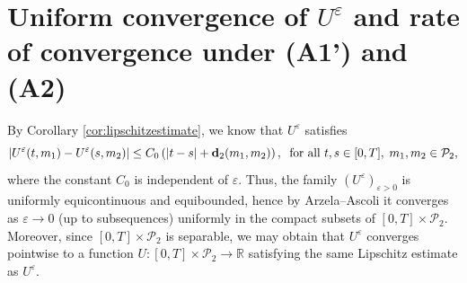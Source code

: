 \documentclass[reqno,11pt]{amsart}
\newtheorem{proposition}[theorem]{Proposition}
\numberwithin{equation}{section}
\newcommand{\R}{\mathbb{R}} %
\newcommand{\e}{\varepsilon}
\newcommand{\ep}{\varepsilon}
\newcommand{\nd}{\noindent}
\begin{document}





\section{Uniform convergence of $U^\ep$ and rate of convergence under (A1') and (A2)} \label{sec:rocresult}

\nd
By Corollary \ref{cor:lipschitzestimate}, we know that $U^\e$ satisfies
$$|U^\e(t,m_1)-U^\e(s,m_2)|\leq C_0 \left(|t-s|+{\bf d}_2(m_1,m_2)\right),\;\;\text{for all }t,s\in[0,T],\; m_1,m_2\in\mathcal{P}_2,$$
where the constant $C_0$ is independent of $\e$. Thus, the family $(U^\e)_{\e>0}$ is uniformly equicontinuous and equibounded, hence by Arzela--Ascoli it converges as $\e\to 0$ (up to subsequences) uniformly in the compact subsets of $[0,T]\times \mathcal{P}_2$. Moreover, since $[0,T]\times \mathcal{P}_2$ is separable, we may obtain that $U^\e$ converges pointwise to a function $U\colon[0,T]\times\mathcal{P}_2\to \R$ satisfying the same Lipschitz estimate as $U^\e$.
\vspace{1mm}
\end{document}
